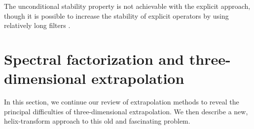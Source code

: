 
\par
The unconditional stability property is not achievable with the
explicit approach, though it is possible to increase the stability of
explicit operators by using relatively long filters
\cite{GPR36.02.00990114,GEO56.11.17701777}.

\section{Spectral factorization and three-dimensional extrapolation}

In this section, we continue our review of extrapolation methods to
reveal the principal difficulties of three-dimensional extrapolation.
We then describe a new, helix-transform approach to this old and
fascinating problem.


